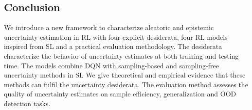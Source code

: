 \subsection*{Conclusion}
\label{sec:conclusion}

We introduce a new framework to characterize aleatoric and epistemic uncertainty estimation in RL with four explicit desiderata, four RL models inspired from SL and a practical evaluation methodology. The desiderata characterize the behavior of uncertainty estimates at both training and testing time. The models combine DQN with sampling-based and sampling-free uncertainty methods in SL 
We give theoretical and empirical evidence that these methods can fulfil the uncertainty desiderata. The evaluation method assesses the quality of uncertainty estimates on sample efficiency, generalization and OOD detection tasks.